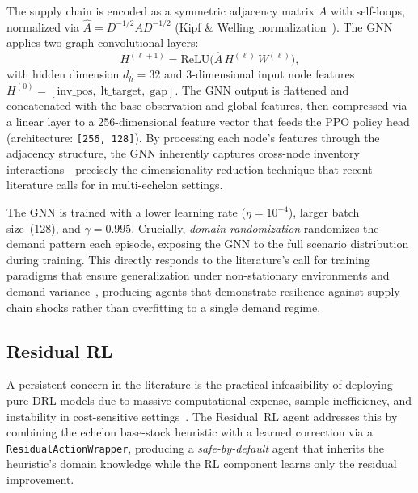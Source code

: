 \documentclass[preprint,12pt]{elsarticle}
\begin{document}
The supply chain is encoded as a symmetric adjacency matrix $A$ with
self-loops, normalized via $\hat{A} = D^{-1/2} A D^{-1/2}$
(Kipf \& Welling normalization~\citep{kipf2017semi}). The GNN applies
two graph convolutional layers:
\begin{equation}\label{eq:gnn}
  H^{(\ell+1)} = \text{ReLU}\bigl(\hat{A} \, H^{(\ell)} \, W^{(\ell)}\bigr),
\end{equation}
with hidden dimension $d_h = 32$ and 3-dimensional input node features
$H^{(0)} = [\text{inv\_pos},\; \text{lt\_target},\; \text{gap}]$.
The GNN output is flattened and concatenated with the base observation
and global features, then compressed via a linear layer to a
256-dimensional feature vector that feeds the PPO policy head
(architecture: \texttt{[256, 128]}).
By processing each node's features through the adjacency structure, the
GNN inherently captures cross-node inventory interactions---precisely the
dimensionality reduction technique that recent literature calls for in
multi-echelon settings.

The GNN is trained with a lower learning rate ($\eta = 10^{-4}$),
larger batch size~(128), and $\gamma = 0.995$. Crucially, \emph{domain
randomization} randomizes the demand pattern each episode, exposing the
GNN to the full scenario distribution during training. This directly
responds to the literature's call for training paradigms that ensure
generalization under non-stationary environments and demand
variance~\citep{gholami2024systematic}, producing agents that
demonstrate resilience against supply chain shocks rather than
overfitting to a single demand regime.

\subsection{Residual RL}

A persistent concern in the literature is the practical infeasibility of
deploying pure DRL models due to massive computational expense, sample
inefficiency, and instability in cost-sensitive
settings~\citep{gholami2024systematic}. The Residual~RL agent addresses
this by combining the echelon base-stock heuristic with a
learned correction via a \texttt{ResidualActionWrapper}, producing a
\emph{safe-by-default} agent that inherits the heuristic's domain
knowledge while the RL component learns only the residual improvement.
\end{document}
